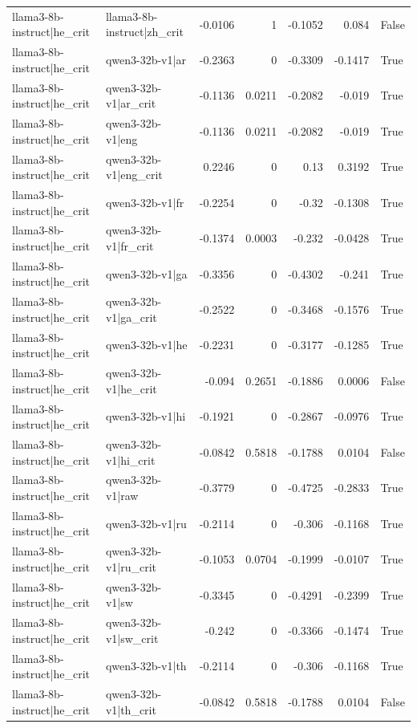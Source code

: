 \begin{table}
\begin{tabular}{l l r r r r l}
llama3-8b-instruct|he_crit & llama3-8b-instruct|zh_crit & -0.0106 & 1 & -0.1052 & 0.084 & False \\
llama3-8b-instruct|he_crit & qwen3-32b-v1|ar & -0.2363 & 0 & -0.3309 & -0.1417 & True \\
llama3-8b-instruct|he_crit & qwen3-32b-v1|ar_crit & -0.1136 & 0.0211 & -0.2082 & -0.019 & True \\
llama3-8b-instruct|he_crit & qwen3-32b-v1|eng & -0.1136 & 0.0211 & -0.2082 & -0.019 & True \\
llama3-8b-instruct|he_crit & qwen3-32b-v1|eng_crit & 0.2246 & 0 & 0.13 & 0.3192 & True \\
llama3-8b-instruct|he_crit & qwen3-32b-v1|fr & -0.2254 & 0 & -0.32 & -0.1308 & True \\
llama3-8b-instruct|he_crit & qwen3-32b-v1|fr_crit & -0.1374 & 0.0003 & -0.232 & -0.0428 & True \\
llama3-8b-instruct|he_crit & qwen3-32b-v1|ga & -0.3356 & 0 & -0.4302 & -0.241 & True \\
llama3-8b-instruct|he_crit & qwen3-32b-v1|ga_crit & -0.2522 & 0 & -0.3468 & -0.1576 & True \\
llama3-8b-instruct|he_crit & qwen3-32b-v1|he & -0.2231 & 0 & -0.3177 & -0.1285 & True \\
llama3-8b-instruct|he_crit & qwen3-32b-v1|he_crit & -0.094 & 0.2651 & -0.1886 & 0.0006 & False \\
llama3-8b-instruct|he_crit & qwen3-32b-v1|hi & -0.1921 & 0 & -0.2867 & -0.0976 & True \\
llama3-8b-instruct|he_crit & qwen3-32b-v1|hi_crit & -0.0842 & 0.5818 & -0.1788 & 0.0104 & False \\
llama3-8b-instruct|he_crit & qwen3-32b-v1|raw & -0.3779 & 0 & -0.4725 & -0.2833 & True \\
llama3-8b-instruct|he_crit & qwen3-32b-v1|ru & -0.2114 & 0 & -0.306 & -0.1168 & True \\
llama3-8b-instruct|he_crit & qwen3-32b-v1|ru_crit & -0.1053 & 0.0704 & -0.1999 & -0.0107 & True \\
llama3-8b-instruct|he_crit & qwen3-32b-v1|sw & -0.3345 & 0 & -0.4291 & -0.2399 & True \\
llama3-8b-instruct|he_crit & qwen3-32b-v1|sw_crit & -0.242 & 0 & -0.3366 & -0.1474 & True \\
llama3-8b-instruct|he_crit & qwen3-32b-v1|th & -0.2114 & 0 & -0.306 & -0.1168 & True \\
llama3-8b-instruct|he_crit & qwen3-32b-v1|th_crit & -0.0842 & 0.5818 & -0.1788 & 0.0104 & False \\

\end{tabular}
\end{table}
